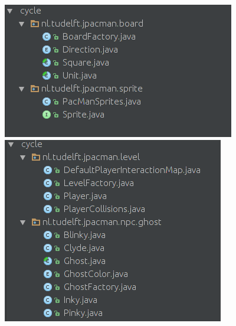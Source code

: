 \documentclass[12pt, openany]{report}
\begin{document}
\begin{figure}[!h]
	\centering
	\includegraphics[scale=0.5]{Images/DependencyCycle1.png}
	\includegraphics[scale=0.5]{Images/DependencyCycle2.png}  
\end{figure}
\end{document}
